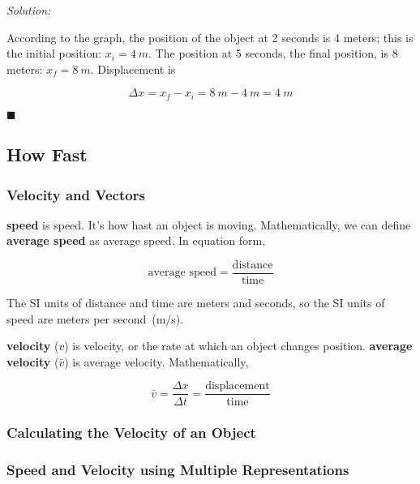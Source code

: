 \documentclass[dvipsnames]{article}
\begin{document}
\textit{Solution:}

According to the graph, the position of the object at 2 seconds is 4 meters; this is the initial position: $x_i = \SI{4}{m}$. The position at 5 seconds, the final position, is 8 meters: $x_f = \SI{8}{m}$. Displacement is

\begin{equation*}
    \Delta x = x_f - x_i = \SI{8}{m} - \SI{4}{m} = \boxed{\SI{4}{m}}
\end{equation*}

\hfill $\blacksquare$

\subsection{How Fast}

\subsubsection{Velocity and Vectors}

\textbf{\Gls{speed}} is \glsdesc{speed}. It's how hast an object is moving. Mathematically, we can define \textbf{\gls{average speed}} as \glsdesc{average speed}. In equation form,

\begin{equation}
    \text{average speed} = \frac{\mathrm{distance}}{\mathrm{time}}
\end{equation}

The SI units of distance and time are meters and seconds, so the SI units of speed are meters per second~(m/s).

\textbf{\Gls{velocity}} ($v$) is \glsdesc{velocity}, or the rate at which an object changes position. \textbf{\Gls{average velocity}} ($\bar{v}$) is \glsdesc{average velocity}. Mathematically, 

\begin{equation}
    \bar{v} = \frac{\Delta x}{\Delta t} = \frac{\mathrm{displacement}}{\mathrm{time}}
\end{equation}

\subsubsection{Calculating the Velocity of an Object}

\subsubsection{Speed and Velocity using Multiple Representations}
\end{document}
